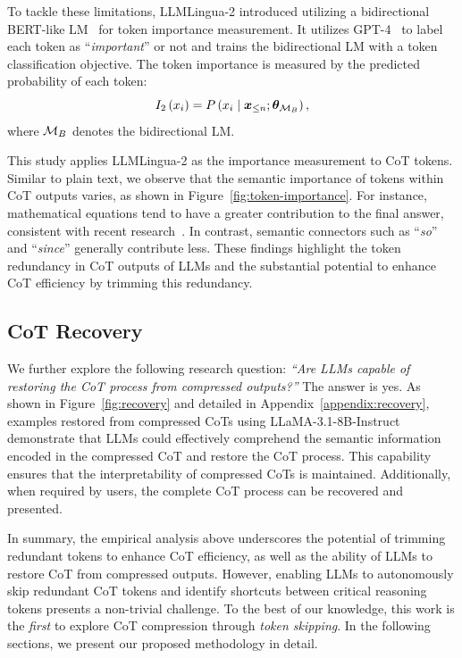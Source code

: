 To tackle these limitations, LLMLingua-2 introduced utilizing a bidirectional BERT-like LM~\cite{bert} for token importance measurement. It utilizes GPT-4~\cite{gpt-4} to label each token as ``\textit{important}'' or not and trains the bidirectional LM with a token
classification objective. The token importance is measured by the predicted probability of each token:
\begin{equation}
I_2\left(x_i\right)= P\left(x_i \mid \bm{x}_{\le n}; \bm{\theta}_{\mathcal{M}_B}\right),
\label{eq:llmlingua2}
\end{equation}
where $\mathcal{M}_B$ denotes the bidirectional LM. 

This study applies LLMLingua-2 as the importance measurement to CoT tokens. Similar to plain text, we observe that the semantic importance of tokens within CoT outputs varies, as shown in Figure~\ref{fig:token-importance}. For instance, mathematical equations tend to have a greater contribution to the final answer, consistent with recent research~\cite{Ma:2024mathmatters}. In contrast, semantic connectors such as ``\textit{so}'' and ``\textit{since}'' generally contribute less. These findings highlight the token redundancy in CoT outputs of LLMs and the substantial potential to enhance CoT efficiency by trimming this redundancy.



\subsection{CoT Recovery}
\label{sec:cot-recovery}
We further explore the following research question: \textit{``Are LLMs capable of restoring the CoT process from compressed outputs?''} The answer is yes. As shown in Figure~\ref{fig:recovery} and detailed in Appendix~\ref{appendix:recovery}, examples restored from compressed CoTs using LLaMA-3.1-8B-Instruct demonstrate that LLMs could effectively comprehend the semantic information encoded in the compressed CoT and restore the CoT process. This capability ensures that the interpretability of compressed CoTs is maintained. Additionally, when required by users, the complete CoT process can be recovered and presented.

In summary, the empirical analysis above underscores the potential of trimming redundant tokens to enhance CoT efficiency, as well as the ability of LLMs to restore CoT from compressed outputs. However, enabling LLMs to autonomously skip redundant CoT tokens and identify shortcuts between critical reasoning tokens presents a non-trivial challenge. To the best of our knowledge, this work is the \textit{first} to explore CoT compression through \textit{token skipping}. In the following sections, we present our proposed methodology in detail.

